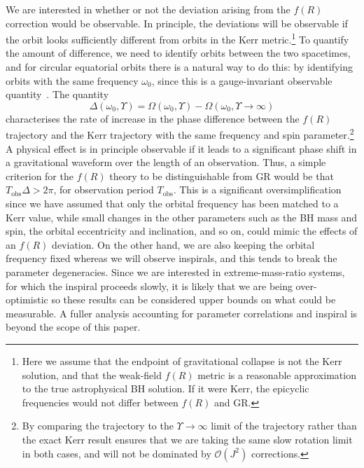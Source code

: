 \documentclass[aps,prd,amsfonts,amssymb,amsmath,nofootinbib,reprint,showpacs]{revtex4-1}
\newcommand{\sub}[1]{\ensuremath{_\text{#1}}}
\newcommand{\order}[1]{\ensuremath{\mathcal{O}({#1})}}
\begin{document}
We are interested in whether or not the deviation arising from the $f(R)$ correction would be observable. In principle, the deviations will be observable if the orbit looks sufficiently different from orbits in the Kerr metric.\footnote{Here we assume that the endpoint of gravitational collapse is not the Kerr solution, and that the weak-field $f(R)$ metric is a reasonable approximation to the true astrophysical BH solution. If it were Kerr, the epicyclic frequencies would not differ between $f(R)$ and GR.} To quantify the amount of difference, we need to identify orbits between the two spacetimes, and for circular equatorial orbits there is a natural way to do this: by identifying orbits with the same frequency $\omega_0$, since this is a gauge-invariant observable quantity~\cite{Detweiler2008}. The quantity
\begin{equation}
\Delta(\omega_0,\Upsilon) = \Omega(\omega_0,\Upsilon)-\Omega(\omega_0,\Upsilon \rightarrow \infty)
\end{equation}
characterises the rate of increase in the phase difference between the $f(R)$ trajectory and the Kerr trajectory with the same frequency and spin parameter.\footnote{By comparing the trajectory to the $\Upsilon \rightarrow\infty$ limit of the trajectory rather than the exact Kerr result ensures that we are taking the same slow rotation limit in both cases, and will not be dominated by $\order{J^2}$ corrections.} A physical effect is in principle observable if it leads to a significant phase shift in a gravitational waveform over the length of an observation. Thus, a simple criterion for the $f(R)$ theory to be distinguishable from GR would be that $T\sub{obs}\Delta > 2\pi$, for observation period $T\sub{obs}$. This is a significant oversimplification since we have assumed that only the orbital frequency has been matched to a Kerr value, while small changes in the other parameters such as the BH mass and spin, the orbital eccentricity and inclination, and so on, could mimic the effects of an $f(R)$ deviation. On the other hand, we are also keeping the orbital frequency fixed whereas we will observe inspirals, and this tends to break the parameter degeneracies. Since we are interested in extreme-mass-ratio systems, for which the inspiral proceeds slowly, it is likely that we are being over-optimistic so these results can be considered upper bounds on what could be measurable. A fuller analysis accounting for parameter correlations and inspiral is beyond the scope of this paper.
\end{document}
